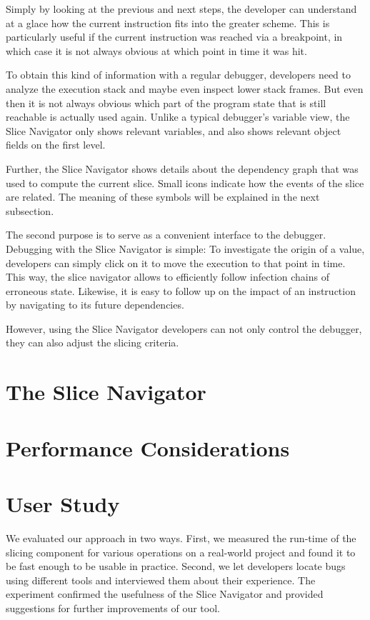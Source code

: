Simply by looking at the previous and next steps, the developer can understand at a glace how the current instruction fits into the greater scheme.
This is particularly useful if the current instruction was reached via a breakpoint, in which case it is not always obvious at which point in time it was hit.

To obtain this kind of information with a regular debugger, developers need to analyze the execution stack and maybe even inspect lower stack frames.
But even then it is not always obvious which part of the program state that is still reachable is actually used again.
Unlike a typical debugger's variable view, the Slice Navigator only shows relevant variables, and also shows relevant object fields on the first level.

Further, the Slice Navigator shows details about the dependency graph that was used to compute the current slice.
Small icons indicate how the events of the slice are related.
The meaning of these symbols will be explained in the next subsection.

The second purpose is to serve as a convenient interface to the debugger.
Debugging with the Slice Navigator is simple:
To investigate the origin of a value, developers can simply click on it to move the execution to that point in time.
This way, the slice navigator allows to efficiently follow infection chains of erroneous state.
Likewise, it is easy to follow up on the impact of an instruction by navigating to its future dependencies.

However, using the Slice Navigator developers can not only control the debugger, they can also adjust the slicing criteria.



\section{The Slice Navigator}

\section{Performance Considerations}
\label{sec:eval}

\section{User Study}

\tmpStart
We evaluated our approach in two ways.
First, we measured the run-time of the slicing component for various operations on a real-world project and found it to be fast enough to be usable in practice.
Second, we let developers locate bugs using different tools and interviewed them about their experience.
The experiment confirmed the usefulness of the Slice Navigator and provided suggestions for further improvements of our tool.

